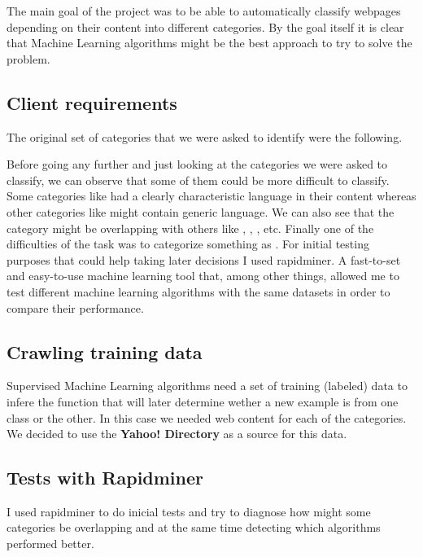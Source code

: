 
The main goal of the project was to be able to automatically classify webpages depending on their content into different categories. 
By the goal itself it is clear that Machine Learning algorithms might be the best approach to try to solve the problem. 

\subsection{Client requirements}

The original set of categories that we were asked to identify were the following.


Before going any further and just looking at the categories we were asked to classify, we can observe that some of them could be more difficult to classify.
Some categories like  had a clearly characteristic language in their content whereas other categories like  might contain generic language.
We can also see that the category  might be overlapping with others like , , , etc. 
Finally one of the difficulties of the task was to categorize something as . 
For initial testing purposes that could help taking later decisions I used rapidminer. A fast-to-set and easy-to-use machine learning tool that, among other things, allowed me to test different
machine learning algorithms with the same datasets in order to compare their performance.

\subsection{Crawling training data}
Supervised Machine Learning algorithms need a set of training (labeled) data to infere the function that will later determine wether a new example is from one class or the other. In this case we needed
web content for each of the categories. We decided to use the {\bf Yahoo! Directory}\cite{yahoo} as a source for this data.
 

  


\subsection{Tests with Rapidminer}
I used rapidminer\cite{rapidminer} to do inicial tests and try to diagnose how might some categories be overlapping and at the same time detecting which algorithms performed better.


